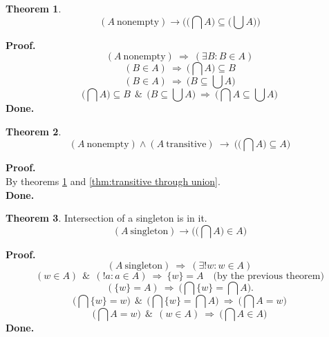 \documentclass[10pt,a4paper]{article}
\theoremstyle{definition}
\newtheorem{theorem}{Theorem}[section]
\newcommand{\AND}{\ \ \&\ \ }
\newcommand{\Done}{\noindent \textbf{Done.}\\}
\newcommand{\IMPLIES}{\ \Longrightarrow\ }
\renewcommand{\implies}{\ \longrightarrow\ }
\newcommand{\intersection}{\bigcap}
\newcommand{\nonempty}{\mathrm{\ nonempty}}
\newcommand{\Proof}{\noindent \textbf{Proof.}\\}
\newcommand{\singleton}{\mathrm{\ singleton}}
\newcommand{\transitive}{\mathrm{\ transitive}}
\newcommand{\union}{\bigcup}
\begin{document}
\begin{theorem}
\label{thm:intersection of nonempty is subset of union}
\[
(A \nonempty) \rightarrow \big(\big(\intersection A\big)\subseteq \big(\union A\big)\big)
\]
\end{theorem}
\Proof
\[
(A \nonempty)
\IMPLIES
(\exists B:B\in A)
\]
\[
(B\in A)
\IMPLIES
\big(\intersection A\big)\subseteq B
\]
\[
(B\in A)
\IMPLIES
\big(B \subseteq \union A\big)
\]
\[
\big(\intersection A\big)\subseteq B
\AND
\big(B \subseteq \union A\big)
\IMPLIES
\big(\intersection A \subseteq \union A\big)
\]
\Done

\begin{theorem}{}
\[
(A\nonempty)
\land
(A\transitive) 
\implies
 \big(\big(\intersection A\big)\subseteq A\big)
\]
\end{theorem}
\Proof
By theorems \ref{thm:intersection of nonempty is subset of union} and \ref{thm:transitive through union}.\\
\Done

\begin{theorem}{Intersection of a singleton is in it.}
\label{thm:intersection of singleton}%
\[
(A \singleton) \rightarrow \big(\big(\intersection A\big)\in A\big)
\]
\end{theorem}
\Proof
\[(A\singleton)\IMPLIES(\exists!w:w\in A)\]
\[(w\in A)\AND(!a:a\in A)\IMPLIES\{w\}=A\quad\mbox{(by the previous theorem)}\]
\[(\{w\}=A)\IMPLIES\big(\intersection\{w\}=\intersection A\big).\]
\[\big(\intersection\{w\}=w\big)\AND\big(\intersection\{w\}=\intersection A\big)\IMPLIES\big(\intersection A=w\big)\]
\[\big(\intersection A=w\big)\AND(w\in A)\IMPLIES\big(\intersection A\in A\big)\]
\Done
\end{document}
